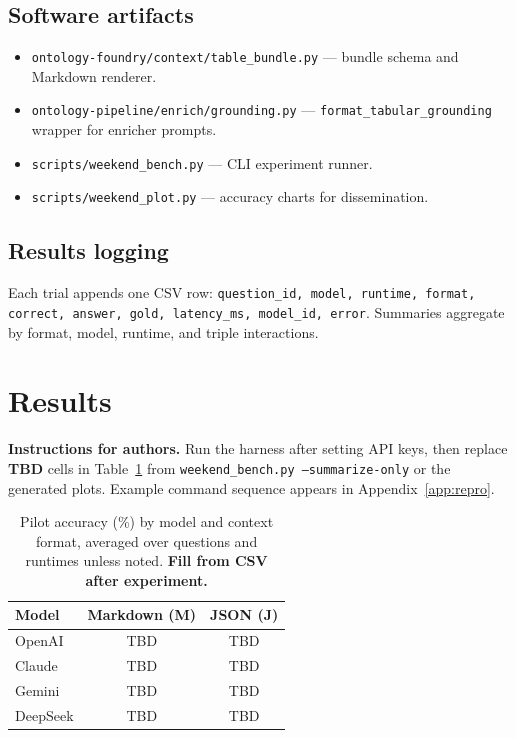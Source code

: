 \documentclass[11pt,a4paper]{article}
\begin{document}
\subsection{Software artifacts}
\begin{itemize}[leftmargin=*]
  \item \texttt{ontology-foundry/context/table\_bundle.py} --- bundle schema and Markdown renderer.
  \item \texttt{ontology-pipeline/enrich/grounding.py} --- \texttt{format\_tabular\_grounding} wrapper for enricher prompts.
  \item \texttt{scripts/weekend\_bench.py} --- CLI experiment runner.
  \item \texttt{scripts/weekend\_plot.py} --- accuracy charts for dissemination.
\end{itemize}

\subsection{Results logging}
Each trial appends one CSV row:
\texttt{question\_id, model, runtime, format, correct, answer, gold, latency\_ms, model\_id, error}.
Summaries aggregate by format, model, runtime, and triple interactions.

\section{Results}
\label{sec:results}

\noindent\textbf{Instructions for authors.}
Run the harness after setting API keys, then replace \textbf{TBD} cells in Table~\ref{tab:main} from \texttt{weekend\_bench.py --summarize-only} or the generated plots.
Example command sequence appears in Appendix~\ref{app:repro}.

\begin{table}[t]
  \centering
  \caption{Pilot accuracy (\%) by model and context format, averaged over questions and runtimes unless noted. \textbf{Fill from CSV after experiment.}}
  \label{tab:main}
  \begin{tabular}{@{}lcc@{}}
    \toprule
    Model & Markdown (M) & JSON (J) \\
    \midrule
    OpenAI   & TBD & TBD \\
    Claude   & TBD & TBD \\
    Gemini   & TBD & TBD \\
    DeepSeek & TBD & TBD \\
    \bottomrule
  \end{tabular}
\end{table}
\end{document}
